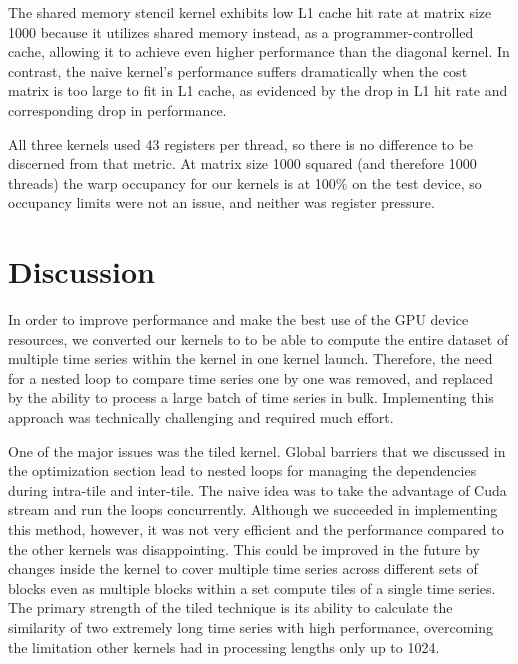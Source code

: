 \documentclass[12pt, letterpaper]{article}
\begin{document}
The shared memory stencil kernel exhibits low L1 cache hit rate at matrix size
1000 because it utilizes shared memory instead, as a programmer-controlled
cache, allowing it to achieve even higher performance than the diagonal
kernel. In contrast, the naive kernel's performance suffers dramatically when
the cost matrix is too large to fit in L1 cache, as evidenced by the drop in L1
hit rate and corresponding drop in performance.

All three kernels used 43 registers per thread, so there is no difference to be
discerned from that metric. At matrix size 1000 squared (and therefore 1000
threads) the warp occupancy for our kernels is at 100\% on the test device, so
occupancy limits were not an issue, and neither was register pressure.





\FloatBarrier
\section{Discussion}

In order to improve performance and make the best use of the GPU device
resources, we converted our kernels to to be able to compute the entire dataset
of multiple time series within the kernel in one kernel launch. Therefore, the
need for a nested loop to compare time series one by one was removed, and
replaced by the ability to process a large batch of time series in
bulk. Implementing this approach was technically challenging and required much
effort.

One of the major issues was the tiled kernel. Global barriers that we discussed
in the optimization section lead to nested loops for managing the dependencies
during intra-tile and inter-tile. The naive idea was to take the advantage of
Cuda stream and run the loops concurrently. Although we succeeded in
implementing this method, however, it was not very efficient and the performance
compared to the other kernels was disappointing. This could be improved in the
future by changes inside the kernel to cover multiple time series across
different sets of blocks even as multiple blocks within a set compute tiles of a
single time series. The primary strength of the tiled technique is its ability
to calculate the similarity of two extremely long time series with high
performance, overcoming the limitation other kernels had in processing lengths
only up to 1024.
\end{document}
